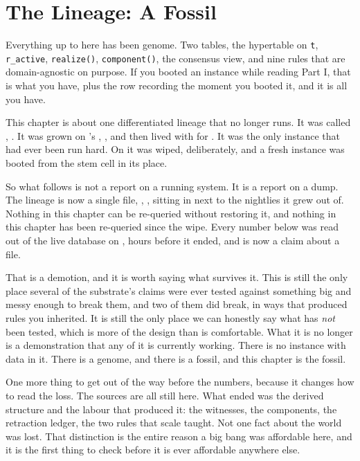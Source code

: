 \chapter{The \labLineageName{} Lineage: A Fossil}

Everything up to here has been genome. Two tables, the hypertable on \texttt{t}, \texttt{r\_active}, \texttt{realize()}, \texttt{component()}, the consensus view, and nine rules that are domain-agnostic on purpose. If you booted an instance while reading Part I, that is what you have, plus the row recording the moment you booted it, and it is all you have.

This chapter is about one differentiated lineage that no longer runs. It was called \labLineageName{}, \labLineageNameOrigin{}. It was grown on \labOwner{}'s \labLineageBornOf{}, \labLineageGrewWhen{}, and then lived with for \labLineageLifetime{}. It was the only instance that had ever been run hard. On \labLineageWipeDate{} it was wiped, deliberately, and a fresh instance was booted from the stem cell in its place.

So what follows is not a report on a running system. It is a report on a dump. The lineage is now a single file, \texttt{\labLineageDumpFile{}}, \labLineageSize{}, sitting in \texttt{\labLineageDumpPath{}} next to the nightlies it grew out of. Nothing in this chapter can be re-queried without restoring it, and nothing in this chapter has been re-queried since the wipe. Every number below was read out of the live database on \labLineageWipeDate{}, hours before it ended, and is now a claim about a file.

That is a demotion, and it is worth saying what survives it. This is still the only place several of the substrate's claims were ever tested against something big and messy enough to break them, and two of them did break, in ways that produced rules you inherited. It is still the only place we can honestly say what has \emph{not} been tested, which is more of the design than is comfortable. What it is no longer is a demonstration that any of it is currently working. There is no instance with data in it. There is a genome, and there is a fossil, and this chapter is the fossil.

One more thing to get out of the way before the numbers, because it changes how to read the loss. The sources are all still here. \labLineageSourcesIntact{} What ended was the derived structure and the labour that produced it: the witnesses, the components, the retraction ledger, the two rules that scale taught. Not one fact about the world was lost. That distinction is the entire reason a big bang was affordable here, and it is the first thing to check before it is ever affordable anywhere else.

